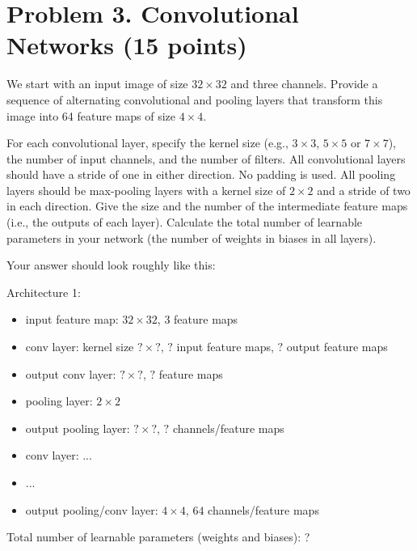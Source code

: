 \documentclass[a4paper,12pt]{article}
\begin{document}
\section*{Problem 3. Convolutional Networks (15 points)}
We start with an input image of size $32 \times 32$ and three channels. 
Provide a sequence of alternating convolutional and pooling layers that transform this image into 64 feature maps of size $4 \times 4$. 

For each convolutional layer, specify the kernel size (e.g., $3 \times 3$, $5 \times 5$ or $7 \times 7$), the number of input channels, and the number of filters. 
All convolutional layers should have a stride of one in either direction. No padding is used. 
All pooling layers should be max-pooling layers with a kernel size of $2 \times 2$ and a stride of two in each direction. 
Give the size and the number of the intermediate feature maps (i.e., the outputs of each layer).
Calculate the total number of learnable parameters in your network (the number of weights in biases in all layers).


Your answer should look roughly like this: 

\noindent Architecture 1:
\begin{itemize}
    \item input feature map: $32 \times 32$, $3$ feature maps
    \item conv layer: kernel size $? \times ?$, $?$ input feature maps, $?$ output feature maps
    \item output conv layer: $? \times ?$, $?$ feature maps
    \item pooling layer: $2 \times 2$
    \item output pooling layer: $? \times ?$, $?$ channels/feature maps
    \item conv layer: ...
    \item ...
    \item output pooling/conv layer: $4 \times 4$, $64$ channels/feature maps
\end{itemize}
Total number of learnable parameters (weights and biases): ? 
\end{document}
